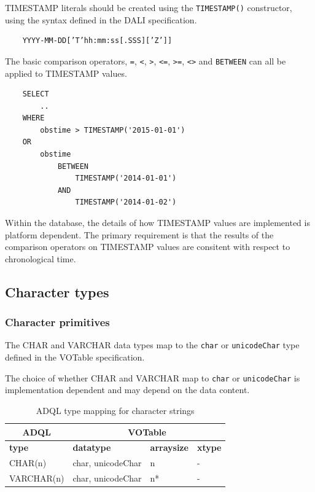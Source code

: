 \documentclass[11pt,a4paper]{ivoa}
\newcommand{\VOTspec}  {VOTable specification\xspace}
\newcommand{\DALIspec} {DALI specification\xspace}
\begin{document}
TIMESTAMP literals should be created using the \verb:TIMESTAMP():
constructor, using the syntax defined in the \DALIspec.

\begin{verbatim}
    YYYY-MM-DD[’T’hh:mm:ss[.SSS][’Z’]]
\end{verbatim}

The basic comparison operators, \verb:=:, \verb:<:, \verb:>:, \verb:<=:, \verb:>=:,
\verb:<>: and \verb:BETWEEN: can all be applied to TIMESTAMP values.

\begin{verbatim}
    SELECT
        ..
    WHERE
        obstime > TIMESTAMP('2015-01-01')
    OR
        obstime
            BETWEEN
                TIMESTAMP('2014-01-01')
            AND
                TIMESTAMP('2014-01-02')
\end{verbatim}

Within the database, the details of how TIMESTAMP values are implemented
is platform dependent. The primary requirement is that the results of the
comparison operators on TIMESTAMP values are consitent with respect to
chronological time.

\subsection{Character types}
\label{sec:types.character}

\subsubsection{Character primitives}
\label{sec:types.character.primitive}

The CHAR and VARCHAR data types map to the \verb:char: or
\verb:unicodeChar: type defined in the \VOTspec.

The choice of whether CHAR and VARCHAR map to \verb:char: or
\verb:unicodeChar: is implementation dependent and may depend
on the data content.

\begin{table}[thm]\footnotesize
    \begin{tabular}
        {|p{}|p{}|p{}|p{}|}
        \hline

        \hline
        \multicolumn{1}{|c|}{\textbf{ADQL}} &
        \multicolumn{3}{|c|}{\textbf{VOTable}}
        \tabularnewline
        
        \hline
        \textbf{type} &
        \textbf{datatype} &
        \textbf{arraysize} &
        \textbf{xtype}
        \tabularnewline

        \hline
        CHAR(n) &
        char, unicodeChar &
        n &
        -
        \tabularnewline

        \hline
        VARCHAR(n) &
        char, unicodeChar &
        n* &
        -
        \tabularnewline

        \hline
    \end{tabular}
    \caption{ADQL type mapping for character strings}
    \label{table:types.character.primitive}
\end{table}
\end{document}

